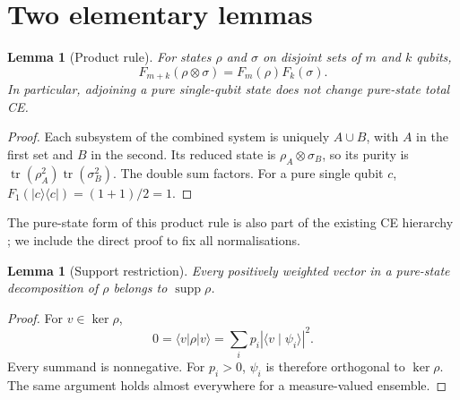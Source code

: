 \documentclass[11pt,a4paper]{article}
\newtheorem{lemma}[theorem]{Lemma}
\newcommand{\tr}{\operatorname{tr}}
\newcommand{\supp}{\operatorname{supp}}
\newcommand{\ket}[1]{\lvert #1\rangle}
\newcommand{\bra}[1]{\langle #1\rvert}
\newcommand{\proj}[1]{\ket{#1}\bra{#1}}
\begin{document}
\section{Two elementary lemmas}
\begin{lemma}[Product rule]\label{lem:product}
For states $\rho$ and $\sigma$ on disjoint sets of $m$ and $k$ qubits,
\begin{equation}\label{eq:product}
 F_{m+k}(\rho\otimes\sigma)=F_m(\rho)F_k(\sigma).
\end{equation}
In particular, adjoining a pure single-qubit state does not change pure-state total CE.
\end{lemma}
\begin{proof}
Each subsystem of the combined system is uniquely $A\cup B$, with $A$ in the first set and $B$ in the second. Its reduced state is $\rho_A\otimes\sigma_B$, so its purity is $\tr(\rho_A^2)\tr(\sigma_B^2)$. The double sum factors. For a pure single qubit $c$, $F_1(\proj c)=(1+1)/2=1$.
\end{proof}
The pure-state form of this product rule is also part of the existing CE hierarchy \cite{schatzki2024}; we include the direct proof to fix all normalisations.

\begin{lemma}[Support restriction]\label{lem:support}
Every positively weighted vector in a pure-state decomposition of $\rho$ belongs to $\supp\rho$.
\end{lemma}
\begin{proof}
For $v\in\ker\rho$,
\[
 0=\bra v\rho\ket v=\sum_i p_i|\langle v\mid\psi_i\rangle|^2.
\]
Every summand is nonnegative. For $p_i>0$, $\psi_i$ is therefore orthogonal to $\ker\rho$. The same argument holds almost everywhere for a measure-valued ensemble.
\end{proof}
\end{document}
